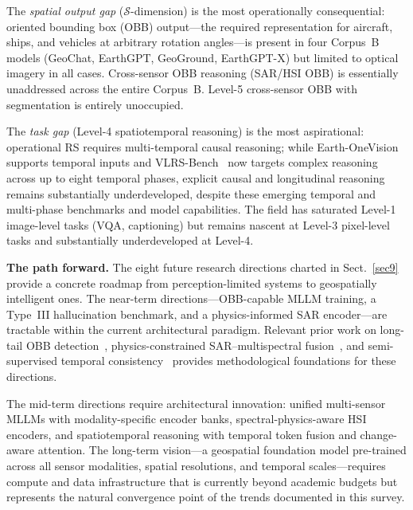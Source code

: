 The \emph{spatial output gap} ($\mathcal{S}$-dimension) is the most operationally
consequential: oriented bounding box (OBB) output---the required representation for
aircraft, ships, and vehicles at arbitrary rotation angles---is present in four
Corpus~B models (GeoChat, EarthGPT, GeoGround, EarthGPT-X) but limited to optical
imagery in all cases. Cross-sensor OBB reasoning (SAR/HSI OBB) is essentially
unaddressed across the entire Corpus~B. Level-5 cross-sensor OBB with segmentation
is entirely unoccupied.

The \emph{task gap} (Level-4 spatiotemporal reasoning) is the most aspirational:
operational RS requires multi-temporal causal reasoning; while Earth-OneVision~\cite{earthonevision2026}
supports temporal inputs and VLRS-Bench~\cite{vlrsbench2026} now targets
complex reasoning across up to eight temporal phases, explicit causal and
longitudinal reasoning remains substantially underdeveloped, despite these
emerging temporal and multi-phase benchmarks and model capabilities. The field
has saturated Level-1 image-level tasks (VQA, captioning) but remains nascent
at Level-3 pixel-level tasks and substantially underdeveloped at Level-4.

\textbf{The path forward.}
The eight future research directions charted in Sect.~\ref{sec9} provide a concrete
roadmap from perception-limited systems to geospatially intelligent ones. The
near-term directions---OBB-capable MLLM training, a Type~III hallucination
benchmark, and a physics-informed SAR encoder---are tractable within the current
architectural paradigm. Relevant prior work on long-tail OBB
detection~\cite{odfe2025}, physics-constrained SAR--multispectral
fusion~\cite{rayleigh2026}, and semi-supervised temporal consistency~\cite{sm2lf2026}
provides methodological foundations for these directions.

The mid-term directions require architectural innovation: unified multi-sensor
MLLMs with modality-specific encoder banks, spectral-physics-aware HSI encoders,
and spatiotemporal reasoning with temporal token fusion and change-aware attention.
The long-term vision---a geospatial foundation model pre-trained across all sensor
modalities, spatial resolutions, and temporal scales---requires compute and data
infrastructure that is currently beyond academic budgets but represents the natural
convergence point of the trends documented in this survey.

